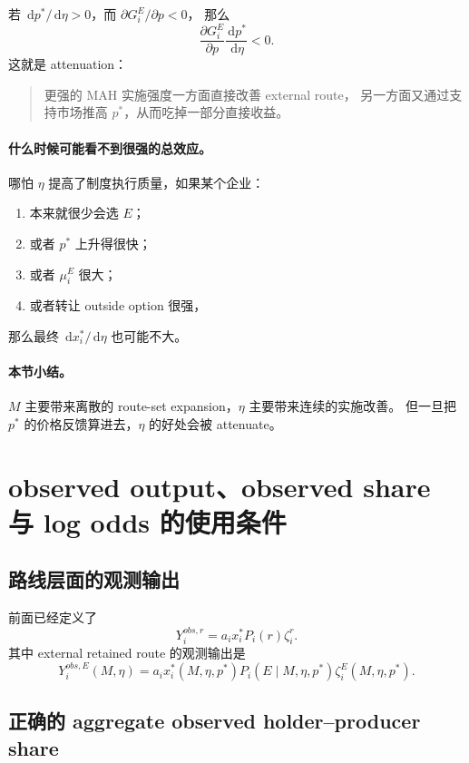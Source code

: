 \documentclass[12pt,UTF8]{ctexart}
\newcommand{\dd}{\,\mathrm{d}}
\theoremstyle{plain}
\theoremstyle{remark}
\begin{document}
若 $\dd p^*/\dd\eta>0$，而 $\partial G_i^E/\partial p<0$，
那么
\[
\frac{\partial G_i^E}{\partial p}\frac{\dd p^*}{\dd \eta}<0.
\]
这就是 attenuation：

\begin{quote}
更强的 MAH 实施强度一方面直接改善 external route，
另一方面又通过支持市场推高 $p^*$，从而吃掉一部分直接收益。
\end{quote}

\paragraph{什么时候可能看不到很强的总效应。}
哪怕 $\eta$ 提高了制度执行质量，如果某个企业：

\begin{enumerate}[leftmargin=2em]
    \item 本来就很少会选 $E$；
    \item 或者 $p^*$ 上升得很快；
    \item 或者 $\mu_i^E$ 很大；
    \item 或者转让 outside option 很强，
\end{enumerate}
那么最终 $\dd x_i^*/\dd\eta$ 也可能不大。

\paragraph{本节小结。}
$M$ 主要带来离散的 route-set expansion，$\eta$ 主要带来连续的实施改善。
但一旦把 $p^*$ 的价格反馈算进去，$\eta$ 的好处会被 attenuate。

\section{observed output、observed share 与 log odds 的使用条件}

\subsection{路线层面的观测输出}

前面已经定义了
\[
Y_i^{obs,r}=a_i x_i^* P_i(r)\zeta_i^r.
\]
其中 external retained route 的观测输出是
\begin{equation}
Y_i^{obs,E}(M,\eta)
=
a_i x_i^*(M,\eta,p^*)
P_i(E\mid M,\eta,p^*)
\zeta_i^E(M,\eta,p^*).
\label{eq:obsE}
\end{equation}

\subsection{正确的 aggregate observed holder--producer share}
\end{document}
